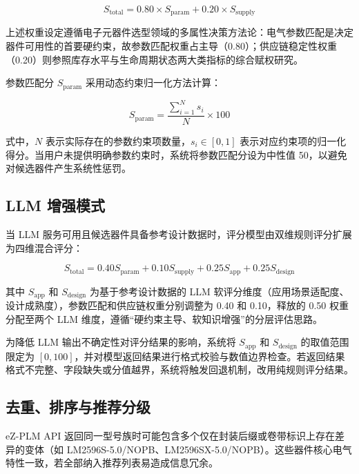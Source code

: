 \begin{equation}
S_{\text{total}} = 0.80 \times S_{\text{param}} + 0.20 \times S_{\text{supply}}
\label{eq:rule}
\end{equation}

上述权重设定遵循电子元器件选型领域的多属性决策方法论：电气参数匹配是决定器件可用性的首要硬约束，故参数匹配权重占主导（0.80）\cite{pecht2008parts}；供应链稳定性权重（0.20）则参照库存水平与生命周期状态两大类指标的综合赋权研究\cite{chen2021supplyrisk,goel2021supply}。

参数匹配分 $S_{\text{param}}$ 采用动态约束归一化方法计算：

\begin{equation}
S_{\text{param}} = \frac{\displaystyle\sum_{i=1}^{N} s_i}{N} \times 100
\label{eq:param}
\end{equation}

式中，$N$ 表示实际存在的参数约束项数量，$s_i \in [0,1]$ 表示对应约束项的归一化得分。当用户未提供明确参数约束时，系统将参数匹配分设为中性值 50，以避免对候选器件产生系统性惩罚。

\subsection{LLM 增强模式}

当 LLM 服务可用且候选器件具备参考设计数据时，评分模型由双维规则评分扩展为四维混合评分：

\begin{equation}
S_{\text{total}} = 0.40 S_{\text{param}} + 0.10 S_{\text{supply}} + 0.25 S_{\text{app}} + 0.25 S_{\text{design}}
\label{eq:hybrid}
\end{equation}

其中 $S_{\text{app}}$ 和 $S_{\text{design}}$ 为基于参考设计数据的 LLM 软评分维度（应用场景适配度、设计成熟度），参数匹配和供应链权重分别调整为 0.40 和 0.10，释放的 0.50 权重分配至两个 LLM 维度，遵循“硬约束主导、软知识增强”的分层评估思路\cite{wang2022selection}。

为降低 LLM 输出不确定性对评分结果的影响，系统将 $S_{\text{app}}$ 和 $S_{\text{design}}$ 的取值范围限定为 $[0,100]$，并对模型返回结果进行格式校验与数值边界检查。若返回结果格式不完整、字段缺失或分值越界，系统将触发回退机制，改用纯规则评分结果。

\subsection{去重、排序与推荐分级}
eZ-PLM API 返回同一型号族时可能包含多个仅在封装后缀或卷带标识上存在差异的变体（如 LM2596S-5.0/NOPB、LM2596SX-5.0/NOPB）。这些器件核心电气特性一致，若全部纳入推荐列表易造成信息冗余。

